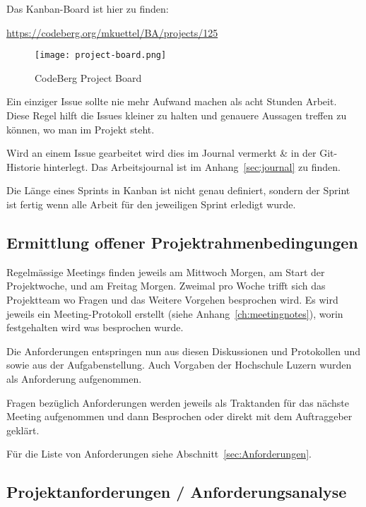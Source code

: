 
Das Kanban-Board ist hier zu finden:

\url{https://codeberg.org/mkuettel/BA/projects/125}

\begin{figure*}[ht]
    \texttt{[image: project-board.png]}
    \caption{CodeBerg Project Board}
    \label{fig:projectboard}
\end{figure*}


Ein einziger Issue sollte nie mehr Aufwand machen als acht Stunden Arbeit. Diese Regel hilft die Issues kleiner zu halten und genauere Aussagen treffen zu können, wo man im Projekt steht.

Wird an einem Issue gearbeitet wird dies im Journal vermerkt \& in der Git-Historie hinterlegt.
Das Arbeitsjournal ist im Anhang~\ref{sec:journal} zu finden.


Die Länge eines Sprints in Kanban ist nicht genau definiert, sondern der Sprint ist fertig wenn alle Arbeit für den jeweiligen Sprint erledigt wurde.

\subsection{Ermittlung offener Projektrahmenbedingungen}
\label{sub:RequirementsEngineering}

Regelmässige Meetings finden jeweils am Mittwoch Morgen, am Start der Projektwoche, und am Freitag Morgen.
Zweimal pro Woche trifft sich das Projektteam wo Fragen und das Weitere
Vorgehen besprochen wird. Es wird jeweils ein Meeting-Protokoll erstellt (siehe
Anhang~\ref{ch:meetingnotes}), worin festgehalten wird was besprochen wurde.

Die Anforderungen entspringen nun aus diesen Diskussionen und Protokollen und sowie aus der Aufgabenstellung.
Auch Vorgaben der Hochschule Luzern wurden als Anforderung aufgenommen.

Fragen bezüglich Anforderungen werden jeweils als Traktanden für das nächste Meeting aufgenommen und dann Besprochen oder direkt mit dem Auftraggeber geklärt.

Für die Liste von Anforderungen siehe Abschnitt~\ref{sec:Anforderungen}.


\subsection{Projektanforderungen / Anforderungsanalyse}
\label{sub:Anforderungen}

